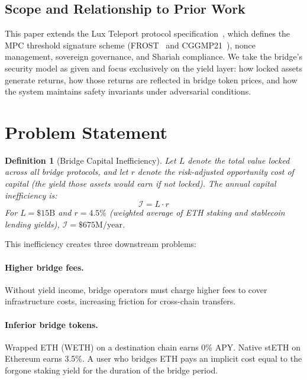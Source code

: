 \documentclass[11pt,twocolumn]{article}
\newtheorem{definition}{Definition}[section]
\begin{document}
\subsection{Scope and Relationship to Prior Work}

This paper extends the Lux Teleport protocol specification~\cite{luxteleport}, which defines the MPC threshold signature scheme (FROST~\cite{frost} and CGGMP21~\cite{cggmp21}), nonce management, sovereign governance, and Shariah compliance. We take the bridge's security model as given and focus exclusively on the yield layer: how locked assets generate returns, how those returns are reflected in bridge token prices, and how the system maintains safety invariants under adversarial conditions.

\section{Problem Statement}\label{sec:problem}

\begin{definition}[Bridge Capital Inefficiency]
Let $L$ denote the total value locked across all bridge protocols, and let $r$ denote the risk-adjusted opportunity cost of capital (the yield those assets would earn if not locked). The annual capital inefficiency is:
\begin{equation}\label{eq:inefficiency}
  \mathcal{I} = L \cdot r
\end{equation}
For $L = \$15\text{B}$ and $r = 4.5\%$ (weighted average of ETH staking and stablecoin lending yields), $\mathcal{I} = \$675\text{M/year}$.
\end{definition}

This inefficiency creates three downstream problems:

\paragraph{Higher bridge fees.} Without yield income, bridge operators must charge higher fees to cover infrastructure costs, increasing friction for cross-chain transfers.

\paragraph{Inferior bridge tokens.} Wrapped ETH (WETH) on a destination chain earns 0\% APY. Native stETH on Ethereum earns 3.5\%. A user who bridges ETH pays an implicit cost equal to the forgone staking yield for the duration of the bridge period.
\end{document}
